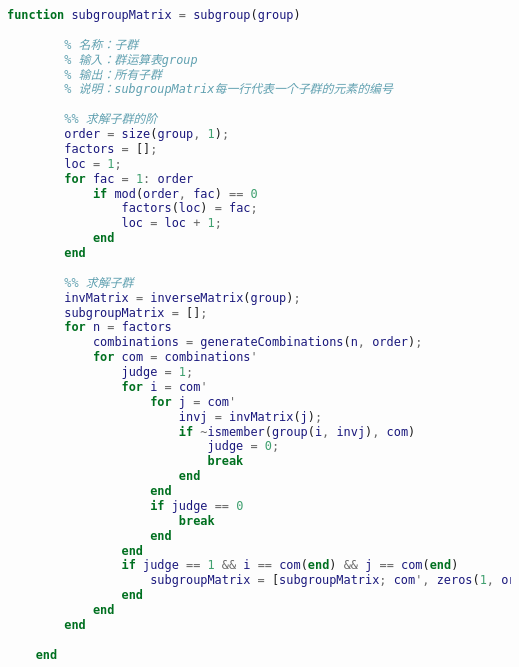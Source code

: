 \begin{lstlisting}[language=Matlab, caption={子群}, label={subgroup}]
	function subgroupMatrix = subgroup(group)
	
	    % 名称：子群
	    % 输入：群运算表group
	    % 输出：所有子群
	    % 说明：subgroupMatrix每一行代表一个子群的元素的编号
	
	    %% 求解子群的阶
	    order = size(group, 1);
	    factors = [];
	    loc = 1;
	    for fac = 1: order
		    if mod(order, fac) == 0
	            factors(loc) = fac;
			    loc = loc + 1;
		    end
	    end
	
	    %% 求解子群
	    invMatrix = inverseMatrix(group);
	    subgroupMatrix = [];
	    for n = factors
	        combinations = generateCombinations(n, order);
	        for com = combinations'
	            judge = 1;
	            for i = com'
	                for j = com'
	                    invj = invMatrix(j);
	                    if ~ismember(group(i, invj), com)
	                        judge = 0;
	                        break
	                    end
	                end
	                if judge == 0
	                    break
	                end
	            end
	            if judge == 1 && i == com(end) && j == com(end)
	                subgroupMatrix = [subgroupMatrix; com', zeros(1, order - size(com', 2))];
	            end
	        end
	    end
	
	end
	
\end{lstlisting}

